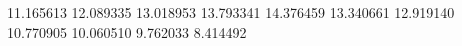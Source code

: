 11.165613
12.089335
13.018953
13.793341
14.376459
13.340661
12.919140
10.770905
10.060510
9.762033
8.414492
